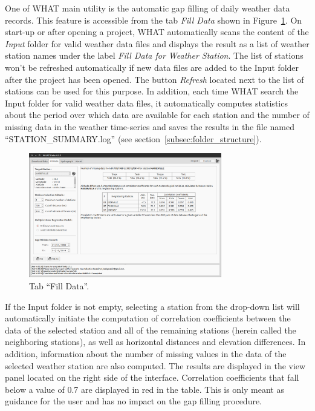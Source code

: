 \documentclass[WHATMANUAL.tex]{subfiles}
\begin{document}
One of WHAT main utility is the automatic gap filling of daily weather data records. This feature is accessible from the tab \emph{Fill Data} shown in Figure~\ref{fig:tab_fillData}. On start-up or after opening a project, WHAT automatically scans the content of the \emph{Input} folder for valid weather data files and displays the result as a list of weather station names under the label \emph{Fill Data for Weather Station}. The list of stations won't be refreshed automatically if new data files are added to the Input folder after the project has been opened. The button \emph{Refresh} located next to the list of stations can be used for this purpose. In addition, each time WHAT search the Input folder for valid weather data files, it automatically computes statistics about the period over which data are available for each station and the number of missing data in the weather time-series and saves the results in the file named ``STATION\_SUMMARY.log'' (see section~\ref{subsec:folder_structure}).

\begin{figure}[!ht]
\centering
\includegraphics[width=0.75\textwidth]{img/WHAT_Screenshot001}
\caption[Tab ``Fill Data''.]{Tab ``Fill Data''.}
\label{fig:tab_fillData}
\end{figure}

If the Input folder is not empty, selecting a station from the drop-down list will automatically initiate the computation of correlation coefficients between the data of the selected station and all of the remaining stations (herein called the neighboring stations), as well as horizontal distances and elevation differences. In addition, information about the number of missing values in the data of the selected weather station are also computed. The results are displayed in the view panel located on the right side of the interface. Correlation coefficients that fall below a value of 0.7 are displayed in red in the table. This is only meant as guidance for the user and has no impact on the gap filling procedure.
\end{document}
